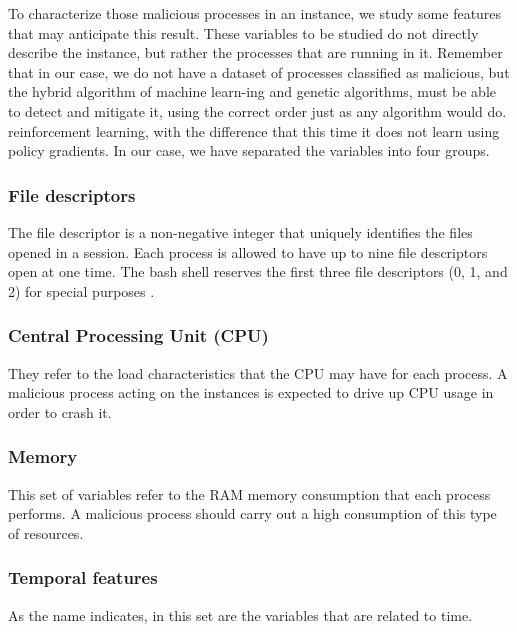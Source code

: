 \documentclass{iosart2c}
\begin{document}
To characterize those malicious processes in an instance, we study some features that may anticipate this result. These variables to be studied do not directly describe the instance, but rather the processes that are running in it. Remember that in our case, we do not have a dataset of processes classified as malicious, but the hybrid algorithm of machine learn-ing and genetic algorithms, must be able to detect and mitigate it, using the correct order just as any algorithm would do. reinforcement learning, with the difference that this time it does not learn using policy gradients. In our case, we have separated the variables into four groups.\\


\subsubsection{File descriptors}

The file descriptor is a non-negative integer that uniquely identifies the files opened in a session. Each process is allowed to have up to nine file descriptors open at one time. The bash shell reserves the first three file descriptors (0, 1, and 2) for special purposes \cite{shell_scripting2}. 

\subsubsection{Central Processing Unit (CPU)}

They refer to the load characteristics that the CPU may have for each process. A malicious process acting on the instances is expected to drive up CPU usage in order to crash it.\\

\subsubsection{Memory}

This set of variables refer to the RAM memory consumption that each process performs. A malicious process should carry out a high consumption of this type of resources. 


\subsubsection{Temporal features}

As the name indicates, in this set are the variables that are related to time.\\
\end{document}
